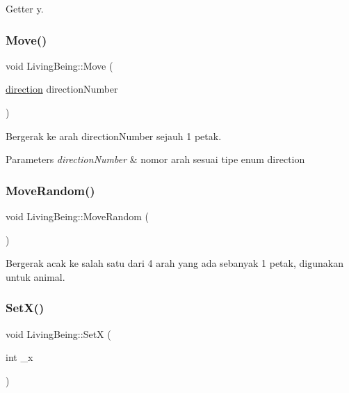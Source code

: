 Getter y. 

\mbox{\label{classLivingBeing_a5d612696127afb2cca466ff8757dde45}} 
\subsubsection{\texorpdfstring{Move()}{Move()}}
{\footnotesize\ttfamily void Living\+Being\+::\+Move (\begin{DoxyParamCaption}\item[{\mbox{\hyperlink{classLivingBeing_a26002fcf620ed05cb9ac2604038b19f1}{direction}}}]{direction\+Number }\end{DoxyParamCaption})}



Bergerak ke arah direction\+Number sejauh 1 petak. 


\begin{DoxyParams}{Parameters}
{\em direction\+Number} & nomor arah sesuai tipe enum direction \\
\hline
\end{DoxyParams}
\mbox{\label{classLivingBeing_a41df7acfc3337b4ae07ae6f107d55a58}} 
\subsubsection{\texorpdfstring{MoveRandom()}{MoveRandom()}}
{\footnotesize\ttfamily void Living\+Being\+::\+Move\+Random (\begin{DoxyParamCaption}{ }\end{DoxyParamCaption})}



Bergerak acak ke salah satu dari 4 arah yang ada sebanyak 1 petak, digunakan untuk animal. 

\mbox{\label{classLivingBeing_a066f825613f93f0d97f644d5f0ce1cb5}} 
\subsubsection{\texorpdfstring{SetX()}{SetX()}}
{\footnotesize\ttfamily void Living\+Being\+::\+SetX (\begin{DoxyParamCaption}\item[{int}]{\+\_\+x }\end{DoxyParamCaption})}



